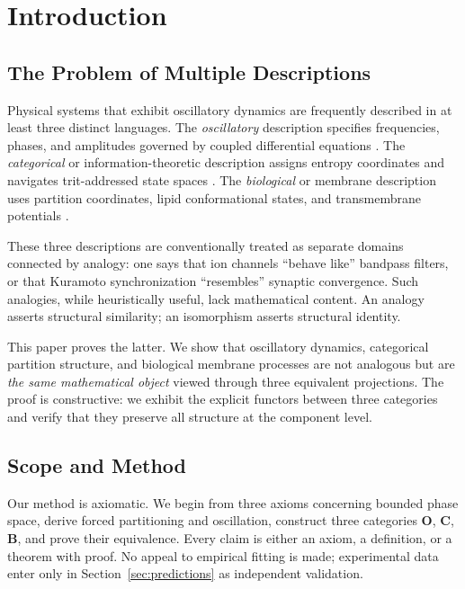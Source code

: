 \documentclass[twocolumn,10pt]{article}
\theoremstyle{remark}
\newcommand{\CatO}{\mathbf{O}}
\newcommand{\CatC}{\mathbf{C}}
\newcommand{\CatB}{\mathbf{B}}
\begin{document}
\section{Introduction}
\label{sec:introduction}

\subsection{The Problem of Multiple Descriptions}

Physical systems that exhibit oscillatory dynamics are frequently described in at least three distinct languages.
The \emph{oscillatory} description specifies frequencies, phases, and amplitudes governed by coupled differential equations \cite{strogatz2015,kuramoto1984}.
The \emph{categorical} or information-theoretic description assigns entropy coordinates and navigates trit-addressed state spaces \cite{shannon1948,cover2006}.
The \emph{biological} or membrane description uses partition coordinates, lipid conformational states, and transmembrane potentials \cite{gennis1989,helfrich1973,hodgkin1952}.

These three descriptions are conventionally treated as separate domains connected by analogy: one says that ion channels ``behave like'' bandpass filters, or that Kuramoto synchronization ``resembles'' synaptic convergence.
Such analogies, while heuristically useful, lack mathematical content.
An analogy asserts structural similarity; an isomorphism asserts structural identity.

This paper proves the latter.
We show that oscillatory dynamics, categorical partition structure, and biological membrane processes are not analogous but are \emph{the same mathematical object} viewed through three equivalent projections.
The proof is constructive: we exhibit the explicit functors between three categories and verify that they preserve all structure at the component level.

\subsection{Scope and Method}

Our method is axiomatic.
We begin from three axioms concerning bounded phase space, derive forced partitioning and oscillation, construct three categories $\CatO$, $\CatC$, $\CatB$, and prove their equivalence.
Every claim is either an axiom, a definition, or a theorem with proof.
No appeal to empirical fitting is made; experimental data enter only in Section~\ref{sec:predictions} as independent validation.
\end{document}
